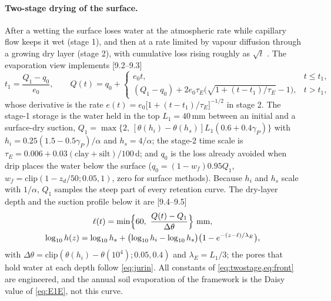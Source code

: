 \documentclass[preprint,12pt]{elsarticle}
\begin{document}
\paragraph{Two-stage drying of the surface.} After a wetting the surface loses water at the atmospheric rate while capillary flow keeps it wet (stage 1), and then at a rate limited by vapour diffusion through a growing dry layer (stage 2), with cumulative loss rising roughly as $\sqrt t$ \cite{Philip1957,Ritchie1972,Lehmann2008,Or2013}. The evaporation view implements [9.2--9.3]
\begin{equation}
t_1=\frac{Q_1-q_0}{e_0},\qquad
Q(t)=q_0+\begin{cases}e_0t, & t\le t_1,\\ (Q_1-q_0)+2e_0\tau_E\bigl(\sqrt{1+(t-t_1)/\tau_E}-1\bigr), & t>t_1,\end{cases}
\label{eq:twostage}
\end{equation}
whose derivative is the rate $e(t)=e_0\bigl[1+(t-t_1)/\tau_E\bigr]^{-1/2}$ in stage 2. The stage-1 storage is the water held in the top $L_1=40$\,mm between an initial and a surface-dry suction, $Q_1=\max\{2,\,[\theta(h_i)-\theta(h_s)]L_1(0.6+0.4\gamma_P)\}$ with $h_i=0.25(1.5-0.5\gamma_P)/\alpha$ and $h_s=4/\alpha$; the stage-2 time scale is $\tau_E=0.006+0.03(\mathrm{clay}+\mathrm{silt})/100$\,d; and $q_0$ is the loss already avoided when drip places the water below the surface ($q_0=(1-w_f)0.95Q_1$, $w_f=\mathrm{clip}(1-z_d/50;0.05,1)$, zero for surface methods). Because $h_i$ and $h_s$ scale with $1/\alpha$, $Q_1$ samples the steep part of every retention curve. The dry-layer depth and the suction profile below it are [9.4--9.5]
\begin{equation}
\begin{gathered}\ell(t)=\min\Bigl\{60,\ \frac{Q(t)-Q_1}{\Delta\theta}\Bigr\}\ \mathrm{mm},\\
\log_{10}h(z)=\log_{10}h_s+\bigl(\log_{10}h_i-\log_{10}h_s\bigr)\bigl(1-e^{-(z-\ell)/\lambda_E}\bigr),\end{gathered}
\label{eq:front}
\end{equation}
with $\Delta\theta=\mathrm{clip}(\theta(h_i)-\theta(10^4);0.05,0.4)$ and $\lambda_E=L_1/3$; the pores that hold water at each depth follow \cref{eq:jurin}. All constants of \cref{eq:twostage,eq:front} are engineered, and the annual soil evaporation of the framework is the Daisy value of \cref{eq:E1E}, not this curve.
\end{document}
